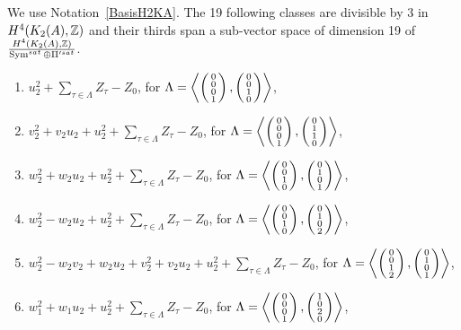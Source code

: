 \begin{prop}\label{XIX}
We use Notation~\ref{BasisH2KA}.
The 19 following classes are divisible by 3 in $H^{4}(K_2(A),\Z)$ and their thirds span a sub-vector space of dimension 19 of $\frac{H^4(K_2(A),\Z)}{\Sym^{sat}\oplus\Pi'^{sat}}$.
\begin{enumerate}
\item
$u_2^2+\sum_{\tau\in \Lambda} Z_\tau-Z_0$, for $\Lambda = \plan{0\\0\\0\\1}{0\\0\\1\\0}$,
\item
$v_2^2+v_2u_2+u_2^2+\sum_{\tau\in \Lambda} Z_\tau-Z_0$, for $\Lambda= \plan{0\\0\\0\\1}{0\\1\\1\\0}$,
\item
$w_2^2+w_2u_2+u_2^2+\sum_{\tau\in \Lambda} Z_\tau-Z_0$, for $\Lambda= \plan{0\\0\\1\\0}{0\\1\\0\\1}$,
\item
$w_2^2-w_2u_2+u_2^2+\sum_{\tau\in \Lambda} Z_\tau-Z_0$, for  $\Lambda= \plan{0\\0\\1\\0}{0\\1\\0\\2}$,
\item
$w_2^2-w_2v_2+w_2u_2+v_2^2+v_2u_2+u_2^2+\sum_{\tau\in \Lambda} Z_\tau-Z_0$, for $\Lambda= \plan{0\\0\\1\\2}{0\\1\\0\\1}$,
\item
$w_1^2+w_1u_2+u_2^2+\sum_{\tau\in \Lambda} Z_\tau-Z_0$, for  $\Lambda= \plan{0\\0\\0\\1}{1\\0\\2\\0}$,

\end{enumerate}
\end{prop}
